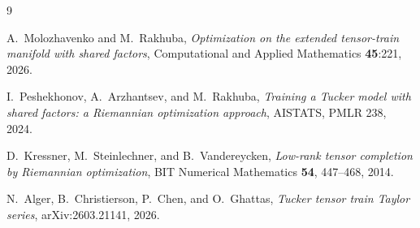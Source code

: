 \documentclass[11pt]{article}
\theoremstyle{definition}
\theoremstyle{remark}
\begin{document}
\begin{thebibliography}{9}

A.~Molozhavenko and M.~Rakhuba,
\emph{Optimization on the extended tensor-train manifold with shared
factors}, Computational and Applied Mathematics \textbf{45}:221, 2026.

I.~Peshekhonov, A.~Arzhantsev, and M.~Rakhuba,
\emph{Training a Tucker model with shared factors: a Riemannian optimization
approach}, AISTATS, PMLR 238, 2024.

D.~Kressner, M.~Steinlechner, and B.~Vandereycken,
\emph{Low-rank tensor completion by Riemannian optimization},
BIT Numerical Mathematics \textbf{54}, 447--468, 2014.

N.~Alger, B.~Christierson, P.~Chen, and O.~Ghattas,
\emph{Tucker tensor train Taylor series}, arXiv:2603.21141, 2026.

\end{thebibliography}
\end{document}
